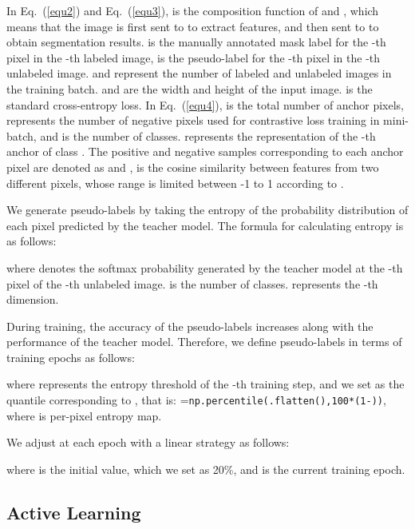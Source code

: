 \documentclass[journal]{IEEEtran}
\newcommand{\eref}[1]{Eq.~(\ref{#1})}
\begin{document}
In \eref{equ2} and \eref{equ3},  is the composition function of  and , which means that the image  is first sent to  to extract features, and then sent to  to obtain segmentation results.  is the manually annotated mask label for the -th pixel in the -th labeled image,  is the pseudo-label for the -th pixel in the -th unlabeled image.  and  represent the number of labeled and unlabeled images in the training batch.  and  are the width and height of the input image.  is the standard cross-entropy loss. In \eref{equ4},  is the total number of anchor pixels,  represents the number of negative pixels used for contrastive loss training in mini-batch, and  is the number of classes.  represents the representation of the -th anchor of class . The positive and negative samples corresponding to each anchor pixel are denoted as  and ,  is the cosine similarity between features from two different pixels, whose range is limited between -1 to 1 according to .

We generate pseudo-labels  by taking the entropy of the probability distribution of each pixel predicted by the teacher model. The formula for calculating entropy is as follows:

where  denotes the softmax probability generated by the teacher model at the -th pixel of the -th unlabeled image.  is the number of classes.  represents the -th dimension.

During training, the accuracy of the pseudo-labels increases along with the performance of the teacher model. Therefore, we define pseudo-labels in terms of training epochs  as follows:

where  represents the entropy threshold of the -th training step, and we set  as the quantile corresponding to , that is: =\texttt{np.percentile(.flatten(),100*(1-))}, where  is per-pixel entropy map.

We adjust at each epoch with a linear strategy as follows:

where  is the initial value, which we set as 20\%, and  is the current training epoch.


\subsection{Active Learning}
\label{sec:active learning}
\end{document}
